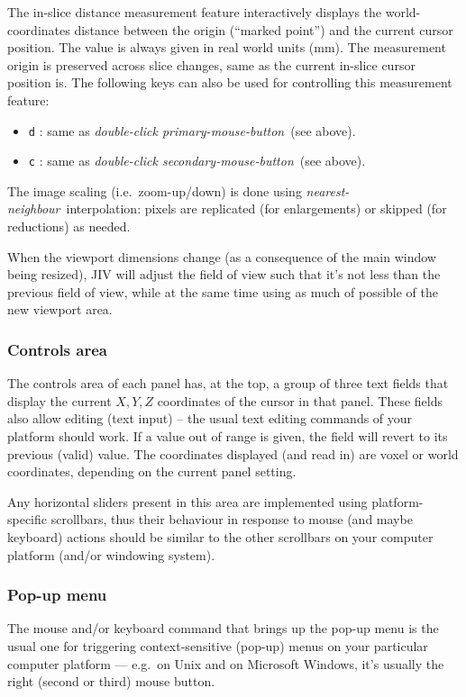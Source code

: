 The in-slice distance measurement feature interactively displays the
world-coordinates distance between the origin (``marked point'') and
the current cursor position.  The value is always given in real world
units (mm). The measurement origin is preserved across slice changes,
same as the current in-slice cursor position is.  The following keys
can also be used for controlling this measurement feature:
\begin{itemize}
\item \verb+d+ : same as {\em double-click primary-mouse-button}\ (see
  above). 
\item \verb+c+ : same as {\em double-click secondary-mouse-button}\ 
  (see above).
\end{itemize}

The image scaling (i.e.\ zoom-up/down) is done using {\em
  nearest-neighbour}\ interpolation: pixels are replicated (for
enlargements) or skipped (for reductions) as needed.

When the viewport dimensions change (as a consequence of the main
window being resized), JIV will adjust the field of view such that
it's not less than the previous field of view, while at the same time
using as much of possible of the new viewport area.

\subsubsection{Controls area}
The controls area of each panel has, at the top, a group of three text
fields that display the current $X,Y,Z$ coordinates of the cursor in
that panel. These fields also allow editing (text input) -- the usual
text editing commands of your platform should work.  If a value out of
range is given, the field will revert to its previous (valid) value.
The coordinates displayed (and read in) are voxel or world
coordinates, depending on the current panel setting.

Any horizontal sliders present in this area are implemented using
platform-specific scrollbars, thus their behaviour in response to
mouse (and maybe keyboard) actions should be similar to the other
scrollbars on your computer platform (and/or windowing system).

\subsubsection{Pop-up menu}
The mouse and/or keyboard command that brings up the pop-up menu is the
usual one for triggering context-sensitive (pop-up) menus on your
particular computer platform --- e.g.\ on Unix and on Microsoft
Windows, it's usually the right (second or third) mouse button.

